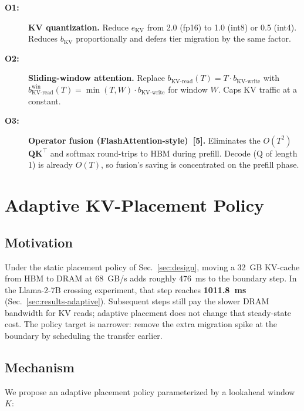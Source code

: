 \documentclass[conference]{IEEEtran}
\begin{document}
\begin{description}
\item[\textbf{O1:}] \textbf{KV quantization.} Reduce $e_{\text{KV}}$ from 2.0 (fp16) to 1.0 (int8) or 0.5 (int4). Reduces $b_{\text{KV}}$ proportionally and defers tier migration by the same factor.
\item[\textbf{O2:}] \textbf{Sliding-window attention.} Replace $b_{\text{KV-read}}(T) = T \cdot b_{\text{KV-write}}$ with $b_{\text{KV-read}}^{\text{win}}(T) = \min(T, W) \cdot b_{\text{KV-write}}$ for window $W$. Caps KV traffic at a constant.
\item[\textbf{O3:}] \textbf{Operator fusion (FlashAttention-style)~[5].} Eliminates the $O(T^2)$ $\mathbf{Q}\mathbf{K}^\top$ and softmax round-trips to HBM during prefill. Decode (Q of length 1) is already $O(T)$, so fusion's saving is concentrated on the prefill phase.
\end{description}
\section{Adaptive KV-Placement Policy}
\label{sec:adaptive}

\subsection{Motivation}

Under the static placement policy of Sec.~\ref{sec:design}, moving a 32~GB KV-cache from HBM to DRAM at 68~GB/s adds roughly 476~ms to the boundary step. In the Llama-2-7B crossing experiment, that step reaches \textbf{1011.8~ms} (Sec.~\ref{sec:results-adaptive}). Subsequent steps still pay the slower DRAM bandwidth for KV reads; adaptive placement does not change that steady-state cost. The policy target is narrower: remove the extra migration spike at the boundary by scheduling the transfer earlier.

\subsection{Mechanism}

We propose an adaptive placement policy parameterized by a lookahead window $K$:
\end{document}
